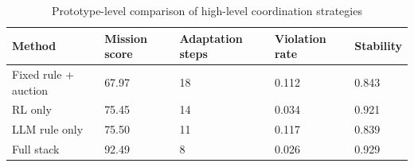 \begin{table}[htbp]
  \centering
  \caption{Prototype-level comparison of high-level coordination strategies}
  \label{tab:prototype_results}
  \begin{tabular}{p{4.3cm} p{2.3cm} p{2.3cm} p{2.3cm} p{1.8cm}}
    \toprule
    Method & Mission score & Adaptation steps & Violation rate & Stability \\
    \midrule
    Fixed rule + auction & 67.97 & 18 & 0.112 & 0.843 \\
    RL only & 75.45 & 14 & 0.034 & 0.921 \\
    LLM rule only & 75.50 & 11 & 0.117 & 0.839 \\
    Full stack & 92.49 & 8 & 0.026 & 0.929 \\
    \bottomrule
  \end{tabular}
\end{table}
